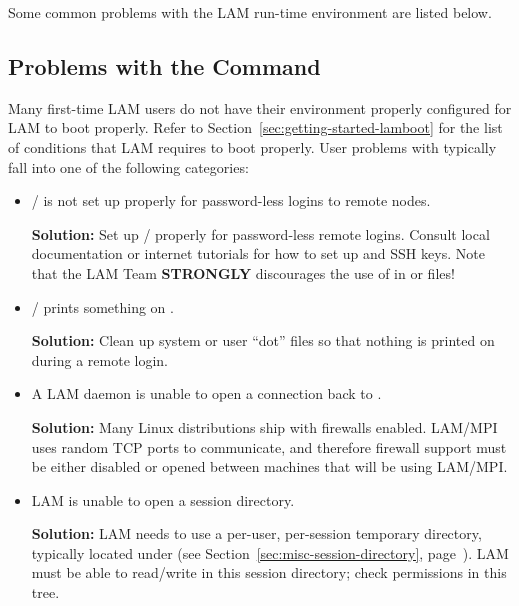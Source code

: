 Some common problems with the LAM run-time environment are listed
below.


\subsection{Problems with the  Command}

Many first-time LAM users do not have their environment properly
configured for LAM to boot properly.  Refer to
Section~\ref{sec:getting-started-lamboot} for the list of conditions
that LAM requires to boot properly.  User problems with 
typically fall into one of the following categories:

\begin{itemize}
\item {}/ is not set up properly for password-less
  logins to remote nodes.
  
  {\bf Solution:} Set up / properly for
  password-less remote logins.  Consult local documentation or
  internet tutorials for how to set up  and SSH
  keys.  Note that the LAM Team {\bf STRONGLY} discourages the use of
  \cmdarg{+} in  or  files!

\item {}/ prints something on .

  {\bf Solution:} Clean up system or user ``dot'' files so that
  nothing is printed on  during a remote login.

\item A LAM daemon is unable to open a connection back to
  .

  {\bf Solution:} Many Linux distributions ship with firewalls
  enabled.  LAM/MPI uses random TCP ports to communicate, and
  therefore firewall support must be either disabled or opened between
  machines that will be using LAM/MPI.

\item LAM is unable to open a session directory.
  
  {\bf Solution:} LAM needs to use a per-user, per-session temporary
  directory, typically located under  (see
  Section~\ref{sec:misc-session-directory},
  page~\pageref{sec:misc-session-directory}).  LAM must be able to
  read/write in this session directory; check permissions in this
  tree.


\end{itemize}
